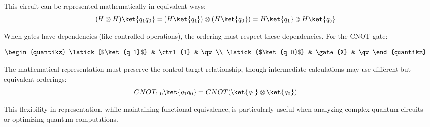 This circuit can be represented mathematically in equivalent ways:
\[
  (H \otimes H)\ket{q_1q_0} = (H\ket{q_1}) \otimes (H\ket{q_0}) = H\ket{q_1}
  \otimes H\ket{q_0}
\]

\noindent
When gates have dependencies (like controlled operations), the ordering must
respect these dependencies. For the CNOT gate:

\begin{align*}
  \begin{quantikz}
    \lstick{$\ket{q_1}$} & \ctrl{1} & \qw \\
    \lstick{$\ket{q_0}$} & \gate{X} & \qw
  \end{quantikz}
\end{align*}

\noindent
The mathematical representation must preserve the control-target
relationship, though intermediate calculations may use different but
equivalent orderings:
\[
  CNOT_{1,0}\ket{q_1q_0} = CNOT(\ket{q_1} \otimes \ket{q_0})
\]

This flexibility in representation, while maintaining functional equivalence,
is particularly useful when analyzing complex quantum circuits or optimizing
quantum computations.

